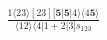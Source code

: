 \documentclass[varwidth, border=5pt]{standalone}
\begin{document}
\begin{my}
$\begin{gathered}
\scriptscriptstyle\frac{1⟨23⟩[23][𝟓|𝟓|4⟩⟨4𝟓⟩}{⟨12⟩⟨4|1+2|3]s_{123}}
\end{gathered}$
\end{my}
\end{document}
